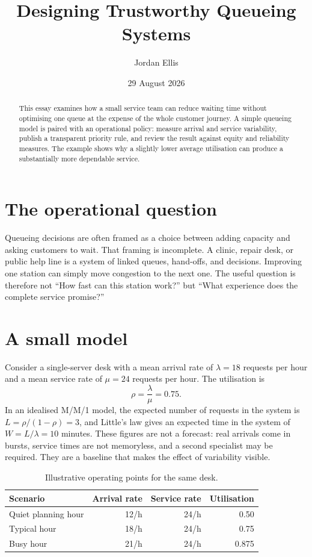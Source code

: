 \documentclass[final]{coursepaper}
\title{Designing Trustworthy Queueing Systems}
\author{Jordan Ellis}
\date{29 August 2026}
\begin{document}
\maketitle

\begin{abstract}
This essay examines how a small service team can reduce waiting time without
optimising one queue at the expense of the whole customer journey.  A simple
queueing model is paired with an operational policy: measure arrival and
service variability, publish a transparent priority rule, and review the
result against equity and reliability measures.  The example shows why a
slightly lower average utilisation can produce a substantially more dependable
service.
\end{abstract}

\section{The operational question}

Queueing decisions are often framed as a choice between adding capacity and
asking customers to wait.  That framing is incomplete.  A clinic, repair
desk, or public help line is a system of linked queues, hand-offs, and
decisions.  Improving one station can simply move congestion to the next one.
The useful question is therefore not ``How fast can this station work?'' but
``What experience does the complete service promise?''

\section{A small model}

Consider a single-server desk with a mean arrival rate of
$\lambda=18$ requests per hour and a mean service rate of
$\mu=24$ requests per hour.  The utilisation is
\[
  \rho = \frac{\lambda}{\mu}=0.75.
\]
In an idealised M/M/1 model, the expected number of requests in the system is
$L=\rho/(1-\rho)=3$, and Little's law gives an expected time in the system of
$W=L/\lambda=10$ minutes.  These figures are not a forecast: real arrivals
come in bursts, service times are not memoryless, and a second specialist may
be required.  They are a baseline that makes the effect of variability
visible.

\begin{table}[ht]
  \centering
  \caption{Illustrative operating points for the same desk.}
  \begin{tabular}{lrrr}
    \toprule
    Scenario & Arrival rate & Service rate & Utilisation \\
    \midrule
    Quiet planning hour & 12/h & 24/h & 0.50 \\
    Typical hour        & 18/h & 24/h & 0.75 \\
    Busy hour            & 21/h & 24/h & 0.875 \\
    \bottomrule
  \end{tabular}
\end{table}
\end{document}
